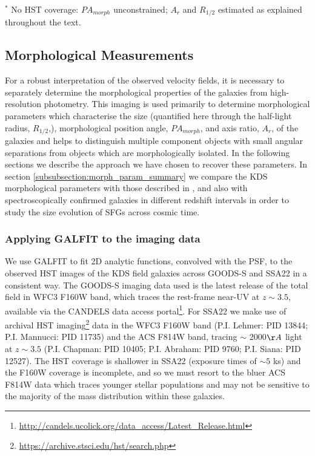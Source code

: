 \documentclass[fleqn,usenatbib]{mn2e}
\begin{document}
\begin{table*}
\begin{threeparttable}
\begin{tabular}{ccccccccccc}
\end{tabular}
\begin{tablenotes}
      \small
      \item $^{*}$ No HST coverage: $PA_{morph}$ unconstrained; $A_{r}$ and $R_{1/2}$ estimated as explained throughout the text.
    \end{tablenotes}
  \end{threeparttable}
  \end{table*}


\subsection{Morphological Measurements}
For a robust interpretation of the observed velocity fields, it is necessary to separately determine the morphological properties of the galaxies from high-resolution photometry.
This imaging is used primarily to determine morphological parameters which characterise the size (quantified here through the half-light radius, $R_{1/2}$,), morphological position angle, $PA_{morph}$, and axis ratio, $A_{r}$, of the galaxies and helps to distinguish multiple component objects with small angular separations from objects which are morphologically isolated.
In the following sections we describe the approach we have chosen to recover these parameters.
In section \cref{subsubsection:morph_param_summary} we compare the KDS morphological parameters with those described in \cite{VanderWel2012}, and also with spectroscopically confirmed galaxies in different redshift intervals in order to study the size evolution of SFGs across cosmic time.

\subsubsection{Applying GALFIT to the imaging data}\label{subsubsec:galfitting}
We use GALFIT \citep{Peng2010_galfit} to fit 2D analytic functions, convolved with the PSF, to the observed HST images of the KDS field galaxies across GOODS-S and SSA22 in a consistent way.
The GOODS-S imaging data used is the latest release of the total field in WFC3 F160W band, which traces the rest-frame near-UV at $z \sim 3.5$, available via the CANDELS \citep{Grogin2011,Koekemoer2011} data access portal\footnote{\tiny{\url{http://candels.ucolick.org/data_access/Latest_Release.html}}}.
For SSA22 we make use of archival HST imaging\footnote{\tiny{\url{https://archive.stsci.edu/hst/search.php}}} data in the WFC3 F160W band (P.I. Lehmer: PID 13844; P.I. Mannucci: PID 11735) and the ACS F814W band, tracing $\sim$ 2000$\AA$ light at $z\sim 3.5$ (P.I. Chapman: PID 10405; P.I. Abraham: PID 9760; P.I. Siana: PID 12527).
The HST coverage is shallower in SSA22 (exposure times of $\sim 5$ ks) and the F160W coverage is incomplete, and so we must resort to the bluer ACS F814W data which traces younger stellar populations and may not be sensitive to the majority of the mass distribution within these galaxies.
\end{document}
